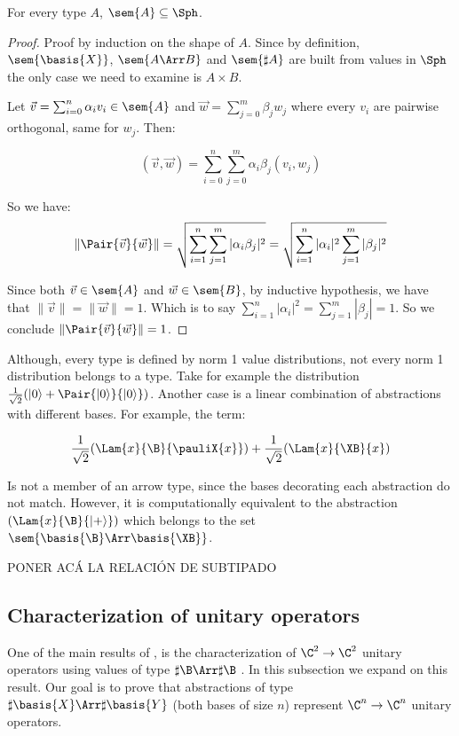 \begin{proposition}\label{prop:UnitaryTypes}
  For every type $A$, $\sem{A}\subseteq\Sph$.
\end{proposition}

\begin{proof}
  Proof by induction on the shape of $A$. Since by definition, $\sem{\basis{X}}$, $\sem{A\Arr B}$ and $\sem{\sharp{A}}$ are built from values in $\Sph$ the only case we need to examine is $A\times B$.
  
  Let $\vec v = \sum_{i=0}^{n} \alpha_i v_i \in\sem{A}$ and $\vec w = \sum_{j=0}^{m} \beta_j w_j$ where every $v_i$ are pairwise orthogonal, same for $w_j$. Then:
     
  \[(\vec v, \vec w) = \sum_{i=0}^{n} \sum_{j=0}^{m} \alpha_i\beta_j (v_i,w_j)\]
  
  So we have: 
  \[\|\Pair{\vec v}{\vec w}\| = \sqrt{\sum_{i=1}^n\sum_{j=1}^{m} |\alpha_i\beta_j|^2} = \sqrt{\sum_{i=1}^n |\alpha_i|^2 \sum_{j=1}^{m} |\beta_j|^2}\]

  Since both $\vec v\in\sem{A}$ and $\vec w\in\sem{B}$, by inductive hypothesis, we have that $\|\vec v\| = \| \vec w \| = 1$. Which is to say $\sum_{i=1}^{n} |\alpha_i|^2 = \sum_{j=1}^{m} |\beta_j| = 1$. So we conclude $\|\Pair{\vec{v}}{\vec{w}}\| = 1$.
  
\end{proof}

Although, every type is defined by norm 1 value distributions, not every norm 1 distribution belongs to a type. Take for example the distribution $\frac{1}{\sqrt{2}} (\ket{0} + \Pair{\ket{0}}{\ket 0})$. Another case is a linear combination of abstractions with different bases. For example, the term:

\[
\frac{1}{\sqrt{2}}(\Lam{x}{\B}{\pauliX{x}}) + \frac{1}{\sqrt{2}}(\Lam{x}{\XB}{x})
\]

Is not a member of an arrow type, since the bases decorating each abstraction do not match. However, it is computationally equivalent to the abstraction $(\Lam{x}{\B}{\ket{+}})$ which belongs to the set $\sem{\basis{\B}\Arr\basis{\XB}}$.

{\color{red} PONER ACÁ LA RELACIÓN DE SUBTIPADO}

\subsection{Characterization of unitary operators}

One of the main results of \cite{DiazcaroGuillermoMiquelValironLICS19}, is the characterization of $\C^2\to\C^2$ unitary operators using values of type $\sharp\B\Arr\sharp\B$ \cite[Theorem IV.12]{DiazcaroGuillermoMiquelValironLICS19}. In this subsection we expand on this result. Our goal is to prove that abstractions of type $\sharp\basis{X}\Arr\sharp\basis{Y}$ (both bases of size $n$) represent $\C^n\to\C^n$ unitary operators.

